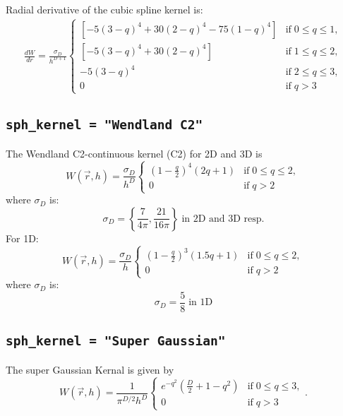 \documentclass[notes.tex]{subfiles}
\begin{document}
Radial derivative of the cubic spline kernel is:
\begin{align}
 \frac{dW}{dr} = \frac{\sigma_D}{h^{D+1}} 
  \begin{cases}
    [-5(3-q)^4+30(2-q)^4-75(1-q)^4] & \text{if} \; 0 \leq q \leq 1, \\
    [-5(3-q)^4 + 30(2-q)^4] & \text{if} \; 1 \leq q \leq 2, \\
   -5(3-q)^4 & \text{if} \; 2 \leq q \leq 3, \\
    0        & \text{if} \;  q >3 
\end{cases}
\end{align}


\subsection{{\tt sph\_kernel = "Wendland C2"}}
The Wendland C2-continuous kernel (C2) for 2D and 3D is
\begin{equation}
W(\vec{r},h) = \frac{\sigma_D}{h^D} 
  \begin{cases}
    \left(1-\frac{q}{2} \right)^4 (2q+1) & \text{if} \; 0 \leq q \leq 2, \\
    0        & \text{if} \;  q > 2 
\end{cases}
\end{equation}
where $\sigma_D$ is:
\begin{equation}
\sigma_D =  \left\{ \frac{7}{4 \pi}, \frac{21}{16\pi}\right\}
         \; \text{in 2D and 3D resp.}
\end{equation}
For 1D:
\begin{equation}
W(\vec{r},h) = \frac{\sigma_D}{h} 
  \begin{cases}
    \left(1-\frac{q}{2} \right)^3 (1.5q+1) & \text{if} \; 0 \leq q \leq 2, \\
    0        & \text{if} \;  q > 2 
\end{cases}
\end{equation}
where $\sigma_D$ is:
\begin{equation}
\sigma_D =  \frac{5}{8}
         \; \text{in 1D}
\end{equation}


\subsection{{\tt sph\_kernel = "Super Gaussian"}}
The super Gaussian Kernal is given by
\begin{equation}
W(\vec{r},h) = \frac{1}{\pi^{D/2} h^D} 
  \begin{cases}
    e^{-q^2} \left(\frac{D}{2} + 1 - q^2 \right) & \text{if} \; 0 \leq q \leq 3, \\
    0        & \text{if} \;  q >3 
    \end{cases}.
\end{equation}
\end{document}
